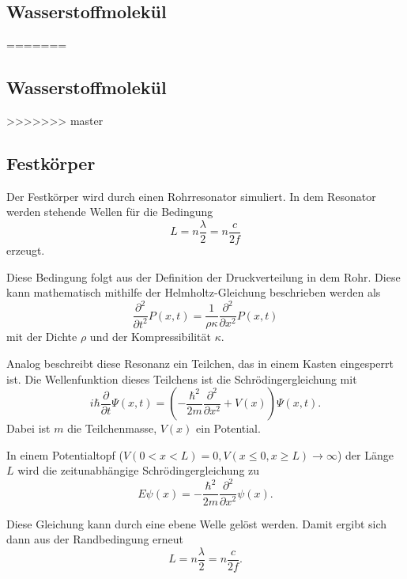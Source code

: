 \subsection{Wasserstoffmolekül}
\label{sec:Wasserstoffmolekül}

=======
\subsection{Wasserstoffmolekül}
\label{sec:Wasserstoffmolekül}

>>>>>>> master
\subsection{Festkörper}
\label{sec:Festkörper}
Der Festkörper wird durch einen Rohrresonator simuliert. In dem Resonator werden stehende Wellen für die Bedingung 
\begin{equation*}
    L = n \frac{\lambda}{2} = n \frac{c}{2f}
\end{equation*}
erzeugt. 

Diese Bedingung folgt aus der Definition der Druckverteilung in dem Rohr. Diese kann mathematisch mithilfe der Helmholtz-Gleichung beschrieben werden als 
\begin{equation*}
    \frac{\partial^2}{\partial t^2} P(x,t) = \frac{1}{\rho\kappa}\frac{\partial^2}{\partial x^2} P(x,t)
\end{equation*}
mit der Dichte $\rho$ und der Kompressibilität $\kappa$. 

Analog beschreibt diese Resonanz ein Teilchen, das in einem Kasten eingesperrt ist. 
Die Wellenfunktion dieses Teilchens ist die Schrödingergleichung mit 
\begin{equation*}
    i \hbar \frac{\partial}{\partial t} \Psi(x,t) = \left(- \frac{\hbar^2}{2m} \frac{\partial^2}{\partial x^2} + V(x)\right) \Psi(x,t).
\end{equation*}
Dabei ist $m$ die Teilchenmasse, $V(x)$ ein Potential. 

In einem Potentialtopf ($V(0 < x < L) = 0, V(x \leq 0, x \geq L) \to \infty$) der Länge $L$ wird die zeitunabhängige Schrödingergleichung zu 
\begin{equation*}
    E \psi(x) = - \frac{\hbar^2}{2m} \frac{\partial^2}{\partial x^2} \psi(x).
\end{equation*}

Diese Gleichung kann durch eine ebene Welle gelöst werden. Damit ergibt sich dann aus der Randbedingung erneut
\begin{equation*}
    L = n \frac{\lambda}{2} = n \frac{c}{2f}.
\end{equation*}




